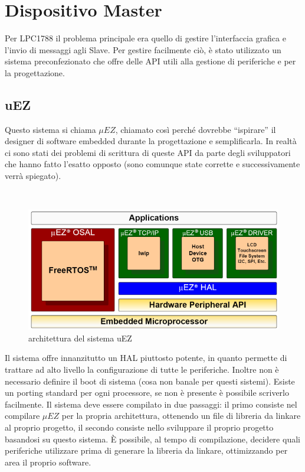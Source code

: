 \documentclass[a4paper,titlepage]{book}
\begin{document}
\section{Dispositivo Master}

Per LPC1788 il problema principale era quello di gestire l'interfaccia grafica e l'invio di messaggi agli Slave. Per gestire facilmente ciò, è stato utilizzato un sistema preconfezionato che offre delle API utili alla gestione di periferiche e per la progettazione. 


\subsection{uEZ}
Questo sistema si chiama $\mu EZ$, chiamato così perché dovrebbe ``ispirare'' il designer di software embedded durante la progettazione e semplificarla. In realtà ci sono stati dei problemi di scrittura di queste API da parte degli sviluppatori che hanno fatto l'esatto opposto (sono comunque state corrette e successivamente verrà spiegato).

~

\begin{figure}[!h]
\centering
\includegraphics[scale=0.7]{uEZ.png}
\caption{architettura del sistema uEZ}\label{fig:1}
\end{figure}

Il sistema offre innanzitutto un HAL piuttosto potente, in quanto permette di trattare ad alto livello la configurazione di tutte le periferiche. Inoltre non è necessario definire il boot di sistema (cosa non banale per questi sistemi). Esiste un porting standard per ogni processore, se non è presente è possibile scriverlo facilmente. Il sistema deve essere compilato in due passaggi: il primo consiste nel compilare $\mu EZ$ per la propria architettura, ottenendo un file di libreria da linkare al proprio progetto, il secondo consiste nello sviluppare il proprio progetto basandosi su questo sistema. È possibile, al tempo di compilazione, decidere quali periferiche utilizzare prima di generare la libreria da linkare, ottimizzando per area il proprio software.
\end{document}
